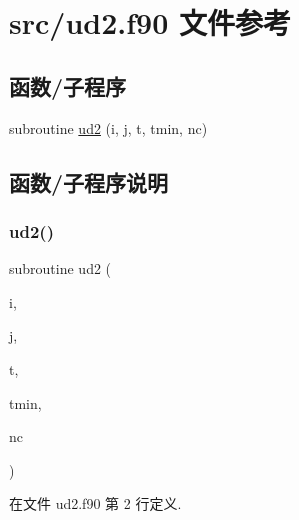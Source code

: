 \hypertarget{ud2_8f90}{}\section{src/ud2.f90 文件参考}
\label{ud2_8f90}
\subsection*{函数/子程序}
\begin{DoxyCompactItemize}
\item 
subroutine \mbox{\hyperlink{ud2_8f90_ab93c42d493b8c2886b6ba6984f9dd69f}{ud2}} (i, j, t, tmin, nc)
\end{DoxyCompactItemize}


\subsection{函数/子程序说明}
\mbox{\label{ud2_8f90_ab93c42d493b8c2886b6ba6984f9dd69f}} 
\subsubsection{\texorpdfstring{ud2()}{ud2()}}
{\footnotesize\ttfamily subroutine ud2 (\begin{DoxyParamCaption}\item[{}]{i,  }\item[{}]{j,  }\item[{}]{t,  }\item[{}]{tmin,  }\item[{}]{nc }\end{DoxyParamCaption})}



在文件 ud2.\+f90 第 2 行定义.

